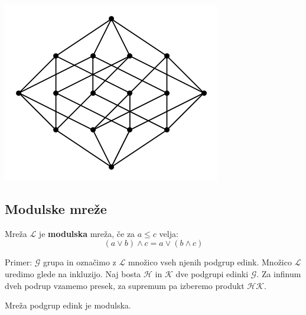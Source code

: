 \documentclass{beamer}
\begin{document}
\begin{frame}
\includegraphics[scale=0.29]{bool4}
\end{frame}




\begin{frame}
\section{Modulske mreže}
\begin{definition}
Mreža $\mathcal{L}$ je \textbf{modulska} mreža, če za $a \leq c$ velja:
$$(a \lor b) \land c = a \lor (b \land c)$$
\end{definition}
\end{frame}


\begin{frame}
\begin{block}{}
Primer: $\mathcal{G}$ grupa in označimo z $\mathcal{L}$ množico vseh  njenih podgrup edink. Množico $\mathcal{L}$ uredimo glede na inkluzijo. Naj bosta $\mathcal{H}$  in $\mathcal{K}$ dve podgrupi edinki $\mathcal{G}$. Za infinum dveh podrup vzamemo presek, za supremum pa izberemo produkt $\mathcal{HK}$.
\end{block}
\end{frame}

\begin{frame}
\begin{theorem}
Mreža podgrup edink je modulska.
\end{theorem}
\end{frame}
\end{document}
